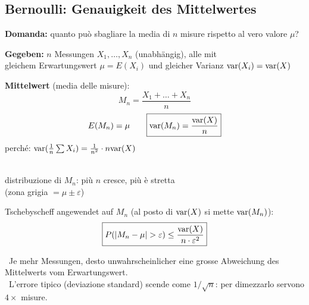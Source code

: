 \subsection{Bernoulli: Genauigkeit des Mittelwertes}

\textbf{Domanda:} quanto può sbagliare la media di $n$ misure rispetto al vero valore $\mu$?

\textbf{Gegeben:} $n$ Messungen $X_1, \ldots, X_n$ (unabhängig), alle mit \\
gleichem Erwartungswert $\mu = E(X_i)$ und gleicher Varianz $\mathrm{var}(X_i) = \mathrm{var}(X)$

\begin{minipage}[c]{0.5\columnwidth}
	\textbf{Mittelwert} (media delle misure):
	$$ M_n = \frac{X_1 + \ldots + X_n}{n} $$
	$$ E(M_n) = \mu \qquad \boxed{ \mathrm{var}(M_n) = \frac{\mathrm{var}(X)}{n} } $$
	\small perché: $\mathrm{var}(\tfrac{1}{n} \sum X_i) = \tfrac{1}{n^2} \cdot n \mathrm{var}(X)$
\end{minipage}
\hfill
\begin{minipage}[c]{0.46\columnwidth}
	\centering
	\\ \tiny distribuzione di $M_n$: più $n$ cresce, più è stretta \\ (zona grigia $= \mu \pm \varepsilon$)
\end{minipage}

\medskip
Tschebyscheff angewendet auf $M_n$ (al posto di $\mathrm{var}(X)$ si mette $\mathrm{var}(M_n)$):
$$ \boxed{ P( | M_n - \mu | > \varepsilon ) \leq \frac{\mathrm{var}(X)}{ n \cdot \varepsilon^2} } $$

\textrightarrow\ Je mehr Messungen, desto unwahrscheinlicher eine grosse Abweichung des Mittelwerts vom Erwartungswert. \\
\textrightarrow\ L'errore tipico (deviazione standard) scende come $1/\sqrt{n}$: per dimezzarlo servono $4\times$ misure.


